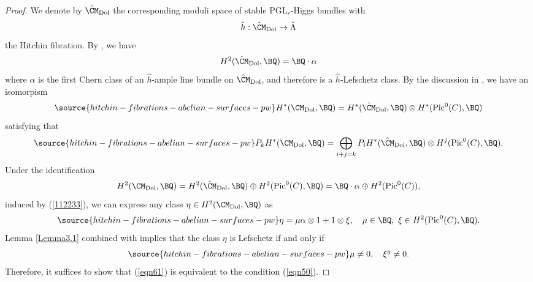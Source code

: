 \begin{proof}
 We denote by $\hat{\CM}_{\mathrm{Dol}}$ the corresponding moduli space of stable $\mathrm{PGL}_r$-Higgs bundles with
\[
\hat{h}: \hat{\CM}_{\mathrm{Dol}} \to \hat{\Lambda}
\]
the Hitchin fibration. By \cite{HT1,Markman}, we have
\[
H^2( \hat{\CM}_{\mathrm{Dol}}, \BQ ) = \BQ \cdot \alpha
\]
where $\alpha$ is the first Chern class of an $\hat{h}$-ample line bundle on   $\hat{\CM}_{\mathrm{Dol}}$, and therefore is
a $\hat{h}$-Lefschetz class. By the discussion in \cite[Section 2.4]{dCHM1}, we have an isomorpism
\begin{equation}\label{112233}
\source{hitchin-fibrations-abelian-surfaces-pw}
H^*(\CM_{\mathrm{Dol}}, \BQ) = H^*( \hat{\CM}_{\mathrm{Dol}}, \BQ ) \otimes H^*(\mathrm{Pic}^0(C), \BQ)
\end{equation}
satisfying that
\begin{equation}\label{eqn71}
\source{hitchin-fibrations-abelian-surfaces-pw}
P_k H^*(\CM_{\mathrm{Dol}}, \BQ) = \bigoplus_{i+j=k} P_iH^*( \hat{\CM}_{\mathrm{Dol}}, \BQ ) \otimes H^j(\mathrm{Pic}^0(C), \BQ).
\end{equation}
Under the identification
\[
H^2(\CM_{\mathrm{Dol}}, \BQ) = H^2( \hat{\CM}_{\mathrm{Dol}}, \BQ ) \oplus H^2(\mathrm{Pic}^0(C), \BQ) = \BQ \cdot \alpha  \oplus H^2(\mathrm{Pic}^0(C)),
\]
induced by (\ref{112233}), we can express any class $\eta \in H^2(\CM_{\mathrm{Dol}}, \BQ)$ as
\begin{equation}\label{123eta}
\source{hitchin-fibrations-abelian-surfaces-pw}
\eta = \mu {\alpha  \otimes 1+ 1\otimes \xi}, \quad \mu \in \BQ,~ \xi \in H^2(\mathrm{Pic}^0(C), \BQ).
\end{equation}
Lemma \ref{Lemma3.1} {combined with \cite[Appendix]{dC}} implies that the class $\eta$ is Lefschetz if and only if
\begin{equation}\label{eqn61}
\source{hitchin-fibrations-abelian-surfaces-pw}
\mu \neq 0, \quad \xi^g\neq 0.
\end{equation}
Therefore, it suffices to show that (\ref{eqn61}) is equivalent to the condition (\ref{eqn50}).


\end{proof}
